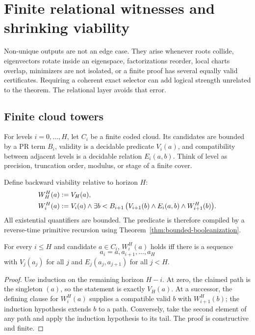 \section{Finite relational witnesses and shrinking viability}
\label{sec:relational}

Non-unique outputs are not an edge case.  They arise whenever roots collide,
eigenvectors rotate inside an eigenspace, factorizations reorder, local charts
overlap, minimizers are not isolated, or a finite proof has several equally
valid certificates.  Requiring a coherent exact selector can add logical
strength unrelated to the theorem.  The relational layer avoids that error.

\subsection{Finite cloud towers}

For levels \(i=0,\ldots,H\), let \(C_i\) be a finite coded cloud.  Its
candidates are bounded by a PR term \(B_i\), validity is a decidable predicate
\(V_i(a)\), and compatibility between adjacent levels is a decidable relation
\(E_i(a,b)\).  Think of level as precision, truncation order, modulus, or stage
of a finite cover.

Define backward viability relative to horizon \(H\):
\begin{align*}
 W_H^H(a)&\mathrel{:=} V_H(a),\\
 W_i^H(a)&\mathrel{:=} V_i(a)\wedge
   \exists b<B_{i+1}\,
   \bigl(V_{i+1}(b)\wedge E_i(a,b)\wedge W_{i+1}^H(b)\bigr).
\end{align*}
All existential quantifiers are bounded.  The predicate is therefore compiled
by a reverse-time primitive recursion using
Theorem~\ref{thm:bounded-booleanization}.

\begin{theorem}
\label{thm:viability-path}
For every \(i\leq H\) and candidate \(a\in C_i\), \(W_i^H(a)\) holds iff
there is a sequence
\[
 a_i=a,a_{i+1},\ldots,a_H
\]
with \(V_j(a_j)\) for all \(j\) and
\(E_j(a_j,a_{j+1})\) for all \(j<H\).
\end{theorem}

\begin{proof}
Use induction on the remaining horizon \(H-i\).  At zero, the claimed path is
the singleton \((a)\), so the statement is exactly \(V_H(a)\).  At a
successor, the defining clause for \(W_i^H(a)\) supplies a compatible valid
\(b\) with \(W_{i+1}^H(b)\); the induction hypothesis extends \(b\) to a
path.  Conversely, take the second element of any path and apply the induction
hypothesis to its tail.  The proof is constructive and finite.
\end{proof}

